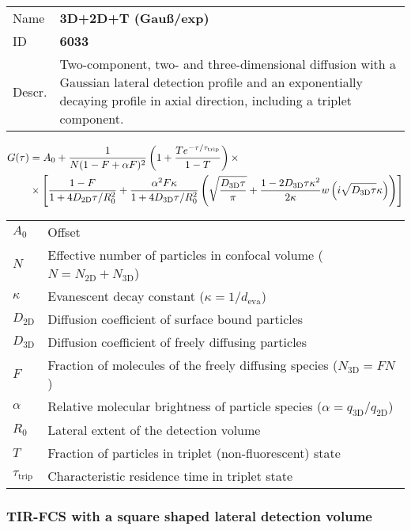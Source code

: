 \noindent \begin{tabular}{lp{}}
Name & \textbf{3D+2D+T (Gauß/exp)} \\ 
ID & \textbf{6033} \\ 
Descr. &  Two-component, two- and three-dimensional diffusion with a Gaussian lateral detection profile and an exponentially decaying profile in axial direction, including a triplet component. \\ 
\end{tabular}
\begin{align}
G(\tau) &= A_0 + \frac{1}{N (1-F + \alpha F)^2} \left(1 + \frac{T e^{-\tau/\tau_\mathrm{trip}}}{1-T}  \right)  \times \\
& \notag \times  \left[
\frac{1-F}{1+ 4 D_\mathrm{2D} \tau/R_0^2} + 
\frac{\alpha^2 F \kappa}{1+ 4 D_\mathrm{3D} \tau/R_0^2} 
\left( \sqrt{\frac{D_\mathrm{3D} \tau}{\pi}} + \frac{1 - 2 D_\mathrm{3D} \tau \kappa^2}{2 \kappa}  w\left(i \sqrt{D_\mathrm{3D} \tau} \kappa\right) \right) \right]
\end{align} 
\begin{center}
\begin{tabular}{ll}
$A_0$ & Offset \\ 
$N$ & Effective number of particles in confocal volume ($N = N_\mathrm{2D}+N_\mathrm{3D}$) \\ 
$\kappa$ &  Evanescent decay constant ($\kappa = 1/d_\mathrm{eva}$)\\ 
$D_\mathrm{2D}$ &  Diffusion coefficient of surface bound particles \\ 
$D_\mathrm{3D}$ &  Diffusion coefficient of freely diffusing particles \\ 
$F$ & Fraction of molecules of the freely diffusing species ($N_\mathrm{3D} = F N$) \\
$\alpha$ & Relative molecular brightness of particle species ($ \alpha = q_\mathrm{3D}/q_\mathrm{2D}$) \\
$R_0$ & Lateral extent of the detection volume \\
$T$ &  Fraction of particles in triplet (non-fluorescent) state\\ 
$\tau_\mathrm{trip}$ &  Characteristic residence time in triplet state \\ 
\end{tabular}
\end{center}
\vspace{2em}




\subsubsection{TIR-FCS with a square shaped lateral detection volume}